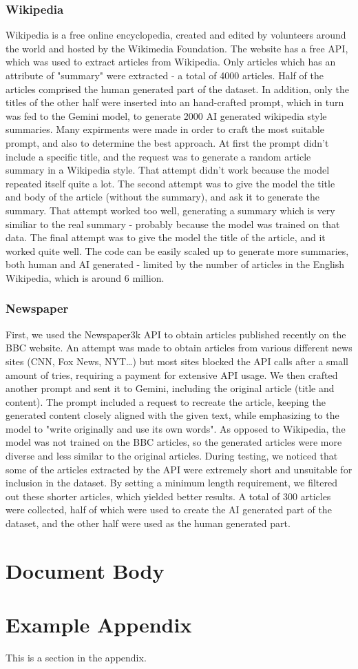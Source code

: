 \documentclass[11pt]{article}
\begin{document}
\subsubsection{Wikipedia}
Wikipedia is a free online encyclopedia, created and edited by volunteers around the world and hosted by the Wikimedia Foundation.
The website has a free API, which was used to extract articles from Wikipedia. Only articles which has an attribute of "summary" were extracted - a total of 4000 articles. Half of the articles comprised the human generated part of the dataset. In addition, only the titles of the other half were inserted into an hand-crafted prompt, which in turn was fed to the Gemini model, to generate 2000 AI generated wikipedia style summaries. Many expirments were made in order to craft the most suitable prompt, and also to determine the best approach. At first the prompt didn't include a specific title, and the request was to generate a random article summary in a Wikipedia style. That attempt didn't work because the model repeated itself quite a lot. The second attempt was to give the model the title and body of the article (without the summary), and ask it to generate the summary. That attempt worked too well, generating a summary which is very similiar to the real summary - probably because the model was trained on that data. The final attempt was to give the model the title of the article, and it worked quite well. The code can be easily scaled up to generate more summaries, both human and AI generated - limited by the number of articles in the English Wikipedia, which is around 6 million.
\subsubsection{Newspaper}
First, we used the Newspaper3k API to obtain articles published recently on the BBC website. An attempt was made to obtain articles from various different news sites (CNN, Fox News, NYT…) but most sites blocked the API calls after a small amount of tries, requiring a payment for extensive API usage. We then crafted another prompt and sent it to Gemini, including the original article (title and content). The prompt included a request to recreate the article, keeping the generated content closely aligned with the given text, while emphasizing to the model to "write originally and use its own words". As opposed to Wikipedia, the model was not trained on the BBC articles, so the generated articles were more diverse and less similar to the original articles. During testing, we noticed that some of the articles extracted by the API were extremely short and unsuitable for inclusion in the dataset. By setting a minimum length requirement, we filtered out these shorter articles, which yielded better results. A total of 300 articles were collected, half of which were used to create the AI generated part of the dataset, and the other half were used as the human generated part.
\section{Document Body}




\appendix

\section{Example Appendix}
\label{sec:appendix}

This is a section in the appendix.
\end{document}
